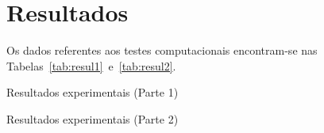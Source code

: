 \section{Resultados}
Os dados referentes aos testes computacionais encontram-se nas
Tabelas~\ref{tab:resul1}~e~\ref{tab:resul2}.
\begin{table}
    \centering
    \caption{Resultados experimentais (Parte 1)}
    \label{tab:resul1}
\end{table}
\begin{table}
    \centering
    \caption{Resultados experimentais (Parte 2)}
    \label{tab:resul2}
\end{table}
